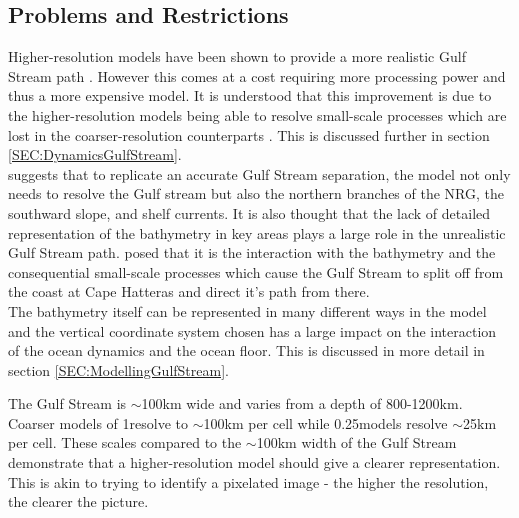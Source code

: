 \documentclass[..\report.tex]{subfiles}
\begin{document}
\subsection{Problems and Restrictions}
\label{SSEC:ProblemsRestrictions}

Higher-resolution models have been shown to provide a more realistic Gulf Stream path \citep{Scaife2011a}.
However this comes at a cost requiring more processing power and thus a more expensive model. 
It is understood %
that this improvement is due to the higher-resolution models being able to resolve small-scale processes which are lost in the coarser-resolution counterparts \citep{Nikurashin2012a}. This is discussed further in section \ref{SEC:DynamicsGulfStream}.\\
\citet{Ezer2016b} suggests that to replicate an accurate Gulf Stream separation, the model not only needs to resolve the Gulf stream but also the northern branches of the \gls{NRG}, the southward slope, and shelf currents.
It is also thought
that the lack of detailed representation of the bathymetry in key areas plays a large role in the unrealistic Gulf Stream path.
\citet{Ezer2016b} posed that it is the interaction with the bathymetry and the consequential small-scale processes which cause the Gulf Stream to split off from the coast at Cape Hatteras and direct it's path from there.\\
The bathymetry itself can be represented in many different ways in the model and the vertical coordinate system chosen has a large impact on the interaction of the ocean dynamics and the ocean floor. This is discussed in more detail in section \ref{SEC:ModellingGulfStream}.

The Gulf Stream is $\sim$100km wide and varies from a depth of 800-1200km. Coarser models of 1\degree resolve to $\sim$100km per cell while 0.25\degree models resolve $\sim$25km per cell. These scales compared to the $\sim$100km width of the Gulf Stream demonstrate that a higher-resolution model should give a clearer representation. This is akin to trying to identify a pixelated image - the higher the resolution, the clearer the picture.
\end{document}

